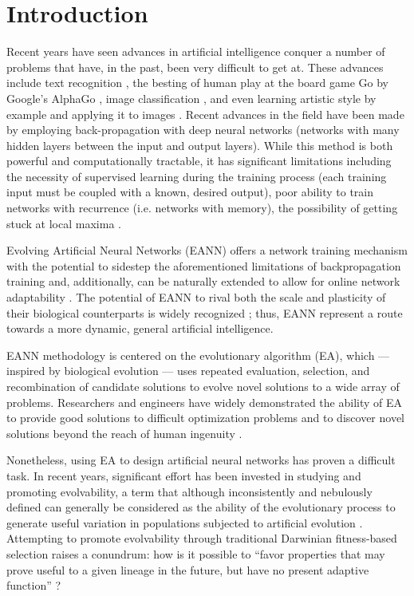 \section{Introduction}
Recent years have seen advances in artificial intelligence conquer a number of problems that have, in the past, been very difficult to get at. These advances include text recognition \cite{GuRecentNetworks}, the besting of human play at the board game Go by Google's AlphaGo \cite{Silver2016MasteringSearch}, image classification \cite{GuRecentNetworks}, and even learning artistic style by example and applying it to images \cite{Gatys2015AStyle}. Recent advances in the field have been made by employing back-propagation with deep neural networks (networks with many hidden layers between the input and output layers). While this method is both powerful and computationally tractable, it has significant limitations including the necessity of supervised learning during the training process (each training input must be coupled with a known, desired output), poor ability to train networks with recurrence (i.e. networks with memory), the possibility of getting stuck at local maxima \cite[pg 312, 364]{Downing2015IntelligenceSystems}. 

Evolving Artificial Neural Networks (EANN) offers a network training mechanism with the potential to sidestep the aforementioned limitations of backpropagation training and, additionally, can be naturally extended to allow for online network adaptability \cite{Tonelli2013OnNetworks}. The potential of EANN to rival both the scale and plasticity of their biological counterparts is widely recognized \cite{Tonelli2013OnNetworks}; thus, EANN represent a route towards a more dynamic, general artificial intelligence. 

EANN methodology is centered on the evolutionary algorithm (EA), which --- inspired by biological evolution --- uses repeated evaluation, selection, and recombination of candidate solutions to evolve novel solutions to a wide array of problems. Researchers and engineers have widely demonstrated the ability of EA to provide good solutions to difficult optimization problems and to discover novel solutions beyond the reach of human ingenuity \cite{Poli2008AProgramming}.

Nonetheless, using EA to design artificial neural networks has proven a difficult task. In recent years, significant effort has been invested in studying and promoting evolvability, a term that although inconsistently and nebulously defined can generally be considered as the ability of the evolutionary process to generate useful variation in populations subjected to artificial evolution \cite{Richter2015EvolvabilitySurvey,Reisinger2005TowardsEvolvability, Wilder2015ReconcilingEvolvability}. Attempting to promote evolvability through traditional Darwinian fitness-based selection raises a conundrum: how is it possible to ``favor properties that may prove useful to a given lineage in the future, but have no present adaptive function'' \cite{Pigliucci2008IsEvolvable}? 

